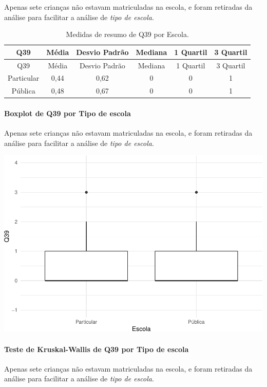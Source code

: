 \documentclass[]{article}
\let\oldparagraph\paragraph
\renewcommand{\paragraph}[1]{\oldparagraph{#1}\mbox{}}
\begin{document}
Apenas sete crianças não estavam matriculadas na escola, e foram retiradas da análise para facilitar a análise de \emph{tipo de escola}.

\begin{longtable}[]{@{}cccccc@{}}
\caption{\label{tab:unnamed-chunk-1532}Medidas de resumo de Q39 por Escola.}\tabularnewline
\toprule
Q39 & Média & Desvio Padrão & Mediana & 1 Quartil & 3 Quartil\tabularnewline
\midrule
\endfirsthead
\toprule
Q39 & Média & Desvio Padrão & Mediana & 1 Quartil & 3 Quartil\tabularnewline
\midrule
\endhead
Particular & 0,44 & 0,62 & 0 & 0 & 1\tabularnewline
Pública & 0,48 & 0,67 & 0 & 0 & 1\tabularnewline
\bottomrule
\end{longtable}

\hypertarget{boxplot-de-q39-por-tipo-de-escola}{%
\paragraph{Boxplot de Q39 por Tipo de escola}\label{boxplot-de-q39-por-tipo-de-escola}}

Apenas sete crianças não estavam matriculadas na escola, e foram retiradas da análise para facilitar a análise de \emph{tipo de escola}.

\begin{center}\includegraphics[width=0.75\linewidth]{relatorio_covid19_files/figure-latex/unnamed-chunk-1533-1} \end{center}

\hypertarget{teste-de-kruskal-wallis-de-q39-por-tipo-de-escola}{%
\paragraph{Teste de Kruskal-Wallis de Q39 por Tipo de escola}\label{teste-de-kruskal-wallis-de-q39-por-tipo-de-escola}}

Apenas sete crianças não estavam matriculadas na escola, e foram retiradas da análise para facilitar a análise de \emph{tipo de escola}.
\end{document}
